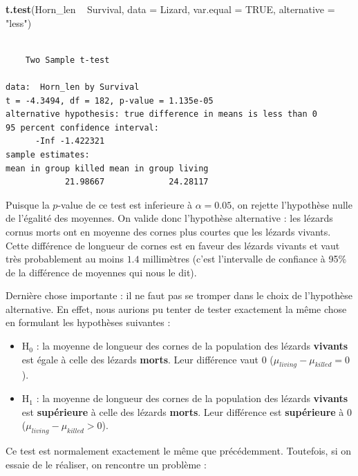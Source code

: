 \documentclass[a4paperpaper,]{article}
\newenvironment{Shaded}{\begin{snugshade}}{\end{snugshade}}
\newcommand{\DataTypeTok}[1]{\textcolor[rgb]{0.00,0.34,0.68}{#1}}
\newcommand{\KeywordTok}[1]{\textcolor[rgb]{0.12,0.11,0.11}{\textbf{#1}}}
\newcommand{\NormalTok}[1]{\textcolor[rgb]{0.12,0.11,0.11}{#1}}
\newcommand{\OperatorTok}[1]{\textcolor[rgb]{0.12,0.11,0.11}{#1}}
\newcommand{\OtherTok}[1]{\textcolor[rgb]{0.00,0.43,0.16}{#1}}
\newcommand{\StringTok}[1]{\textcolor[rgb]{0.75,0.01,0.01}{#1}}
\providecommand{\tightlist}{%
  \setlength{\itemsep}{0pt}\setlength{\parskip}{0pt}}
\begin{document}
\begin{Shaded}
\begin{Highlighting}[]
\KeywordTok{t.test}\NormalTok{(Horn_len }\OperatorTok{~}\StringTok{ }\NormalTok{Survival, }
       \DataTypeTok{data =}\NormalTok{ Lizard, }\DataTypeTok{var.equal =} \OtherTok{TRUE}\NormalTok{,}
       \DataTypeTok{alternative =} \StringTok{"less"}\NormalTok{)}
\end{Highlighting}
\end{Shaded}

\begin{verbatim}

    Two Sample t-test

data:  Horn_len by Survival
t = -4.3494, df = 182, p-value = 1.135e-05
alternative hypothesis: true difference in means is less than 0
95 percent confidence interval:
      -Inf -1.422321
sample estimates:
mean in group killed mean in group living 
            21.98667             24.28117 
\end{verbatim}

Puisque la \(p\)-value de ce test est inferieure à \(\alpha = 0.05\), on rejette l'hypothèse nulle de l'égalité des moyennes. On valide donc l'hypothèse alternative : les lézards cornus morts ont en moyenne des cornes plus courtes que les lézards vivants. Cette différence de longueur de cornes est en faveur des lézards vivants et vaut très probablement au moins \(1.4\) millimètres (c'est l'intervalle de confiance à 95\% de la différence de moyennes qui nous le dit).

Dernière chose importante : il ne faut pas se tromper dans le choix de l'hypothèse alternative. En effet, nous aurions pu tenter de tester exactement la même chose en formulant les hypothèses suivantes :

\begin{itemize}
\tightlist
\item
  H\(_0\) : la moyenne de longueur des cornes de la population des lézards \textbf{vivants} est égale à celle des lézards \textbf{morts}. Leur différence vaut 0 (\(\mu_{living}-\mu_{killed} = 0\)).
\item
  H\(_1\) : la moyenne de longueur des cornes de la population des lézards \textbf{vivants} est \textbf{supérieure} à celle des lézards \textbf{morts}. Leur différence est \textbf{supérieure} à 0 (\(\mu_{living}-\mu_{killed} > 0\)).
\end{itemize}

Ce test est normalement exactement le même que précédemment. Toutefois, si on essaie de le réaliser, on rencontre un problème :
\end{document}
